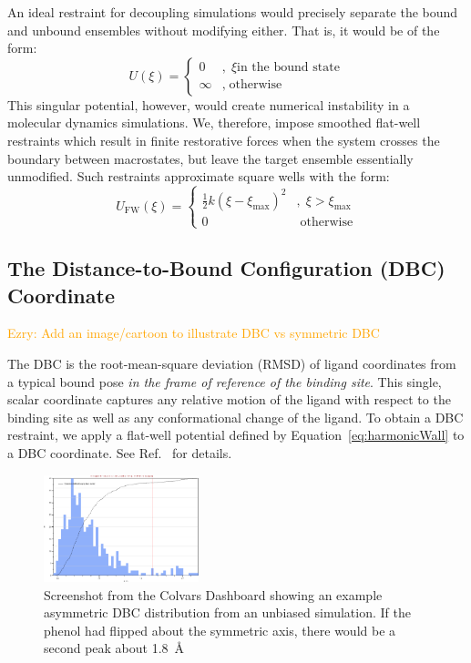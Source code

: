 \documentclass[9pt,tutorial]{Styling/livecoms}
\newcommand{\ezry}[1]{\textcolor{orange}{Ezry: #1}}
\begin{document}
An ideal restraint for decoupling simulations would precisely separate the bound and unbound ensembles without modifying either. That is, it would be of the form:
\begin{equation} \label{eq:squareWell}
    U(\xi) = \begin{cases}
        0 &, \; \xi \text{in the bound state}\\
        \infty &, \; \text{otherwise}
    \end{cases}
\end{equation}
\noindent This singular potential, however, would create numerical instability in a molecular dynamics simulations. We, therefore, impose smoothed flat-well restraints which result in finite restorative forces when the system crosses the boundary between macrostates, but leave the target ensemble essentially unmodified. Such restraints approximate square wells with the form:
\begin{equation} \label{eq:harmonicWall}
    U_\mathrm{FW}(\xi) = \begin{cases}
        \frac{1}{2}k \left(\xi-\xi_\mathrm{max}\right)^2 &, \; \xi > \xi_\mathrm{max}\\
        0                                                & \; \text{otherwise}
    \end{cases}
\end{equation}


\subsection{The Distance-to-Bound Configuration (DBC) Coordinate}
\ezry{Add an image/cartoon to illustrate DBC vs symmetric DBC}

The DBC is the root-mean-square deviation (RMSD) of ligand coordinates from a typical bound pose \textit{in the frame of reference of the binding site}. 
This single, scalar coordinate captures any relative motion of the ligand with respect to the binding site as well as any conformational change of the ligand. 
To obtain a DBC restraint, we apply a flat-well potential defined by Equation~\ref{eq:harmonicWall} to a DBC coordinate.
See Ref.~ for details.
\begin{figure}[!hb]
    \centering
\includegraphics[width=0.4\textwidth]{CVDBscreenshots/histogram.png} 
    \caption{Screenshot from the Colvars Dashboard showing an example asymmetric DBC distribution from an unbiased simulation. If the phenol had flipped about the symmetric axis, there would be a second peak about 1.8~\AA{}}
\label{step:DBCwidth}
\end{figure}
\end{document}
